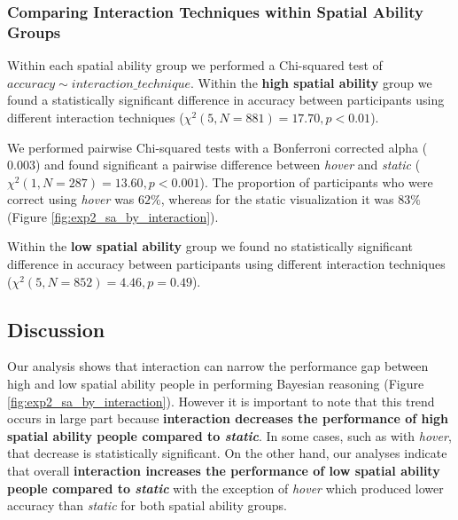 \subsubsection*{\textbf{Comparing Interaction Techniques within Spatial Ability Groups}}
Within each spatial ability group we performed a Chi-squared test of $accuracy \sim interaction\_technique$. Within the \textbf{high spatial ability} group we found a statistically significant difference in accuracy between participants using different interaction techniques ($\chi^2(5, N =  881) = 17.70, p < 0.01$). 

We performed pairwise Chi-squared tests with a Bonferroni corrected alpha ($0.003$) and found significant a pairwise difference between \textit{hover} and \textit{static} ($\chi^2(1, N = 287) = 13.60, p < 0.001$). The proportion of participants who were correct using \textit{hover} was $62\%$, whereas for the static visualization it was $83\%$ (Figure \ref{fig:exp2_sa_by_interaction}). 

Within the \textbf{low spatial ability} group we found no statistically significant difference in accuracy between participants using different interaction techniques ($\chi^2(5, N =  852) = 4.46, p = 0.49$). 

    
\subsection{Discussion} 
 Our analysis shows that interaction can narrow the performance gap between high and low spatial ability people in performing Bayesian reasoning (Figure \ref{fig:exp2_sa_by_interaction}). However it is important to note that this trend occurs in large part because \textbf{interaction decreases the performance of high spatial ability people compared to \textit{static}}. In some cases, such as with \textit{hover}, that decrease is statistically significant. On the other hand, our analyses indicate that overall \textbf{interaction increases the performance of low spatial ability people compared to \textit{static}} with the exception of \textit{hover} which produced lower accuracy than \textit{static} for both spatial ability groups.        


